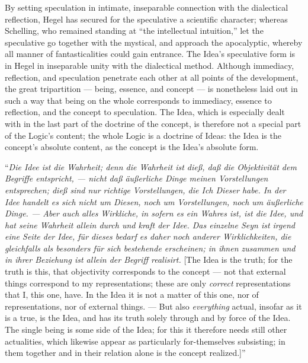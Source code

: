 \documentclass[12pt]{book}
\begin{document}
By setting speculation in intimate, inseparable connection with the dialectical reflection, Hegel has
secured for the speculative a scientific character; whereas Schelling, who remained standing at ``the
intellectual intuition,'' let the speculative go together with the mystical, and approach the
apocalyptic, whereby all manner of fantasticalities could gain entrance.
The Idea's speculative form is in Hegel in inseparable unity with the dialectical method. Although
immediacy, reflection, and speculation penetrate each other at all points of the development, the great
tripartition — being, essence, and concept — is nonetheless laid out in such a way that being on the
whole corresponds to immediacy, essence to reflection, and the concept to speculation. The Idea, which
is especially dealt with in the last part of the doctrine of the concept, is therefore not a special
part of the Logic's content; the whole Logic is a doctrine of Ideas: the Idea is the concept's absolute
content, as the concept is the Idea's absolute form.

``\textit{Die Idee ist die Wahrheit; denn die Wahrheit ist dieß, daß die Objektivität dem Begriffe
entspricht, — nicht daß äußerliche Dinge meinen Vorstellungen entsprechen; dieß sind nur} \emph{richtige}
\textit{Vorstellungen, die Ich Dieser habe. In der Idee handelt es sich nicht um Diesen, noch um
Vorstellungen, noch um äußerliche Dinge. — Aber auch} \emph{alles} \textit{Wirkliche, in sofern es ein
Wahres ist, ist die Idee, und hat seine Wahrheit allein durch und kraft der Idee. Das einzelne Seyn ist
irgend eine Seite der Idee, für dieses bedarf es daher noch anderer Wirklichkeiten, die gleichfalls als
besonders für sich bestehende erscheinen; in ihnen zusammen und in ihrer Beziehung ist allein der
Begriff realisirt.} [The Idea is the truth; for the truth is this, that objectivity corresponds to the
concept — not that external things correspond to my representations; these are only \emph{correct}
representations that I, this one, have. In the Idea it is not a matter of this one, nor of
representations, nor of external things. — But also \emph{everything} actual, insofar as it is a true,
is the Idea, and has its truth solely through and by force of the Idea. The single being is some side
of the Idea; for this it therefore needs still other actualities, which likewise appear as particularly
for-themselves subsisting; in them together and in their relation alone is the concept realized.]''
\end{document}
